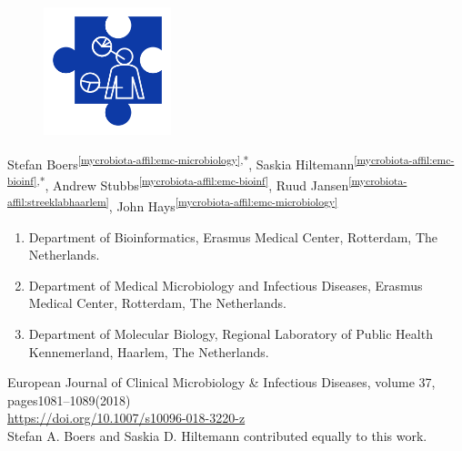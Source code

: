\cleartorightpage
\setcounter{NAT@ctr}{-1}

\chapter*{}\label{chapter:mycrobiota}

\begin{figure}[t!]
\centering
\includegraphics[height=10em]{frontmatter/images/chapter-header-microbiota.png}
\end{figure}
\vspace{-4cm}

Stefan Boers\textsuperscript{\ref{mycrobiota-affil:emc-microbiology},*},
Saskia Hiltemann\textsuperscript{\ref{mycrobiota-affil:emc-bioinf},*},
Andrew Stubbs\textsuperscript{\ref{mycrobiota-affil:emc-bioinf}},
Ruud Jansen\textsuperscript{\ref{mycrobiota-affil:streeklabhaarlem}},
John Hays\textsuperscript{\ref{mycrobiota-affil:emc-microbiology}}

\small
\begin{enumerate}
\itemsep-0.5em
\item Department of Bioinformatics, Erasmus Medical Center, Rotterdam, The Netherlands.\label{mycrobiota-affil:emc-bioinf}
\item Department of Medical Microbiology and Infectious Diseases, Erasmus Medical Center, Rotterdam, The Netherlands.\label{mycrobiota-affil:emc-microbiology}
\item Department of Molecular Biology, Regional Laboratory of Public Health Kennemerland, Haarlem, The Netherlands.\label{mycrobiota-affil:streeklabhaarlem}
\end{enumerate}

{\color{chaptergrey}{Published in:}} European Journal of Clinical Microbiology \& Infectious Diseases, volume 37, pages1081–1089(2018) \\
{\color{chaptergrey}{DOI:}} \url{https://doi.org/10.1007/s10096-018-3220-z} \\
{\color{chaptergrey}{*:}} Stefan A. Boers and Saskia D. Hiltemann contributed equally to this work.

